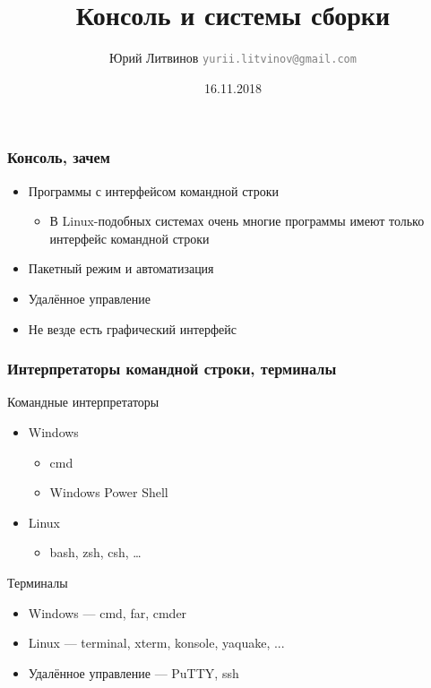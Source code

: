 \documentclass[xetex,mathserif,serif]{beamer}
\title{Консоль и системы сборки}
\author[Юрий Литвинов]{Юрий Литвинов \newline \textcolor{gray}{\small\texttt{yurii.litvinov@gmail.com}}}
\date{16.11.2018}
\begin{document}
	
	\frame{\titlepage}

	\begin{frame}
		\frametitle{Консоль, зачем}
		\begin{itemize}
			\item Программы с интерфейсом командной строки
			\begin{itemize}
				\item В Linux-подобных системах очень многие программы имеют только интерфейс командной строки
			\end{itemize}
			\item Пакетный режим и автоматизация
			\item Удалённое управление
			\item Не везде есть графический интерфейс
		\end{itemize}
	\end{frame}

	\begin{frame}
		\frametitle{Интерпретаторы командной строки, терминалы}
		Командные интерпретаторы
		\begin{itemize}
			\item Windows
			\begin{itemize}
				\item cmd
				\item Windows Power Shell
			\end{itemize}
			\item Linux
			\begin{itemize}
				\item bash, zsh, csh, …
			\end{itemize}
		\end{itemize}
		Терминалы
		\begin{itemize}
			\item Windows --- cmd, far, cmder
			\item Linux --- terminal, xterm, konsole, yaquake, ...
			\item Удалённое управление --- PuTTY, ssh
		\end{itemize}
	\end{frame}
\end{document}

